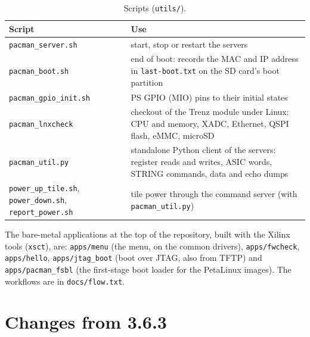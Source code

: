 \documentclass[12pt]{article}
\newcommand{\f}[1]{\texttt{#1}}
\begin{document}
\begin{table}[H]
\centering\small
\begin{tabularx}{\linewidth}{lL}
\toprule
Script & Use \\
\midrule
\f{pacman\_server.sh} & start, stop or restart the servers \\
\f{pacman\_boot.sh} & end of boot:  records the MAC and IP address in \f{last-boot.txt} on the SD
  card's boot partition \\
\f{pacman\_gpio\_init.sh} & PS GPIO (MIO) pins to their initial states \\
\f{pacman\_lnxcheck} & checkout of the Trenz module under Linux:  CPU and memory, XADC, Ethernet,
  QSPI flash, eMMC, microSD \\
\f{pacman\_util.py} & standalone Python client of the servers:  register reads and writes, ASIC
  words, STRING commands, data and echo dumps \\
\f{power\_up\_tile.sh}, \f{power\_down.sh}, \f{report\_power.sh} & tile power through the command
  server (with \f{pacman\_util.py}) \\
\bottomrule
\end{tabularx}
\caption{Scripts (\f{utils/}).}
\label{tbl:scripts}
\end{table}

The bare-metal applications at the top of the repository, built with the Xilinx tools (\f{xsct}),
are:  \f{apps/menu} (the menu, on the common drivers), \f{apps/fwcheck}, \f{apps/hello},
\f{apps/jtag\_boot} (boot over JTAG, also from TFTP) and \f{apps/pacman\_fsbl} (the first-stage
boot loader for the PetaLinux images).  The workflows are in \f{docs/flow.txt}.

\section{Changes from 3.6.3}\label{sec:open}
\end{document}
